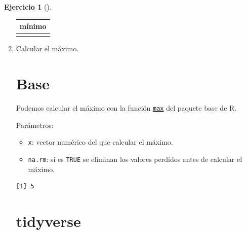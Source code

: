 \documentclass[
  spanish,
  a4paper,
]{scrreport}
\newenvironment{Shaded}{\begin{snugshade}}{\end{snugshade}}
\newcommand{\FunctionTok}[1]{\textcolor[rgb]{0.28,0.35,0.67}{#1}}
\newcommand{\NormalTok}[1]{\textcolor[rgb]{0.00,0.23,0.31}{#1}}
\newcommand{\SpecialCharTok}[1]{\textcolor[rgb]{0.37,0.37,0.37}{#1}}
\providecommand{\tightlist}{%
  \setlength{\itemsep}{0pt}\setlength{\parskip}{0pt}}
\theoremstyle{definition}
\newtheorem{exercise}{Ejercicio}[chapter]
\theoremstyle{remark}
\begin{document}
\begin{exercise}[]
\begin{enumerate}
\begin{tcolorbox}
  \begin{longtable}[]{@{}r@{}}
  \toprule\noalign{}
  mínimo \\
  \midrule\noalign{}
  \endhead
  \bottomrule\noalign{}
  \endlastfoot
  0 \\
  \end{longtable}

  \end{tcolorbox}
\item
  Calcular el máximo.

  \begin{tcolorbox}[enhanced jigsaw, colback=white, coltitle=black, toprule=.15mm, rightrule=.15mm, opacitybacktitle=0.6, opacityback=0, bottomtitle=1mm, toptitle=1mm, titlerule=0mm, breakable, leftrule=.75mm, title=\textcolor{quarto-callout-tip-color}{\faLightbulb}\hspace{0.5em}{Solución}, arc=.35mm, left=2mm, bottomrule=.15mm, colframe=quarto-callout-tip-color-frame, colbacktitle=quarto-callout-tip-color!10!white]

  \section{Base}

  Podemos calcular el máximo con la función
  \href{https://www.rdocumentation.org/packages/base/versions/3.6.2/topics/max}{\texttt{max}}
  del paquete base de R.

  Parámetros:

  \begin{itemize}
  \tightlist
  \item
    \texttt{x}: vector numérico del que calcular el máximo.
  \item
    \texttt{na.rm}: si es \texttt{TRUE} se eliminan los valores perdidos
    antes de calcular el máximo.
  \end{itemize}

\begin{Shaded}
\end{Shaded}

\begin{verbatim}
[1] 5
\end{verbatim}

  \section{tidyverse}


\end{tcolorbox}
\end{enumerate}
\end{exercise}
\end{document}

